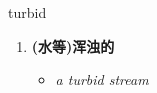 
\begin{frame}
{\huge turbid}
\begin{center}
\begin{enumerate}\Large
  \item \textbf{(水等)浑浊的}
  \begin{itemize}
    \item \em{\Large{a turbid stream}}
  \end{itemize}
\end{enumerate}
\end{center}
\end{frame}
